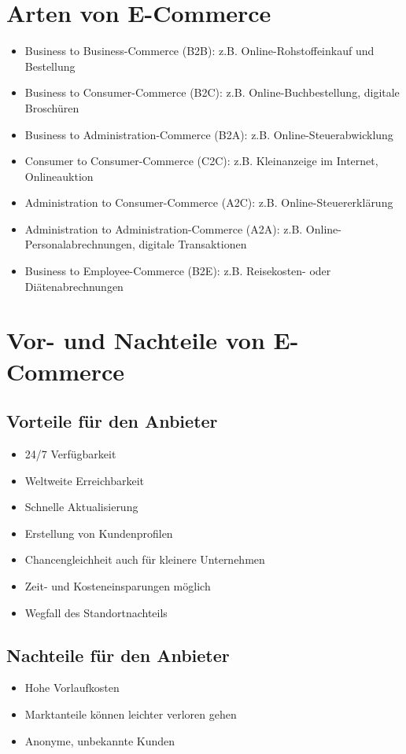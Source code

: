 \documentclass[a4paper]{article}
\begin{document}
\section{Arten von E-Commerce}

\begin{itemize}
\item Business to Business-Commerce (B2B): z.B. Online-Rohstoffeinkauf und Bestellung
\item Business to Consumer-Commerce (B2C): z.B. Online-Buchbestellung, digitale Broschüren
\item Business to Administration-Commerce (B2A): z.B. Online-Steuerabwicklung
\item Consumer to Consumer-Commerce (C2C): z.B. Kleinanzeige im Internet, Onlineauktion
\item Administration to Consumer-Commerce (A2C): z.B. Online-Steuererklärung
\item Administration to Administration-Commerce (A2A): z.B. Online-Personalabrechnungen, digitale Transaktionen
\item Business to Employee-Commerce (B2E): z.B. Reisekosten- oder Diätenabrechnungen

\end{itemize}

\section{Vor- und Nachteile von E-Commerce}

\subsection{Vorteile für den Anbieter}

\begin{itemize}
\item 24/7 Verfügbarkeit
\item Weltweite Erreichbarkeit
\item Schnelle Aktualisierung
\item Erstellung von Kundenprofilen
\item Chancengleichheit auch für kleinere Unternehmen
\item Zeit- und Kosteneinsparungen möglich
\item Wegfall des Standortnachteils
\end{itemize}

\subsection{Nachteile für den Anbieter}
\begin{itemize}
\item Hohe Vorlaufkosten
\item Marktanteile können leichter verloren gehen
\item Anonyme, unbekannte Kunden
\end{itemize}
\end{document}
